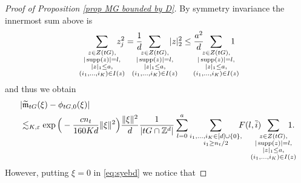 \documentclass[a4paper,oneside, reqno]{amsart}
\numberwithin{equation}{section}
\theoremstyle{definition}%
\theoremstyle{definition}
\theoremstyle{definition}%
\theoremstyle{definition}
\newcommand{\Z}{\mathbb{Z}}
\DeclareMathOperator{\supp}{supp}
\begin{document}
\begin{proof}[Proof of Proposition \ref{prop MG bounded by D}]
By symmetry invariance the innermost sum above is
\[
\sum_{\substack{z \in Z(tG),
\\ |\supp(z)|=l, \\ |z|_1 \le a, \\ (i_1,\ldots,i_K) \in I(z)
}}  \hspace{-0.4cm} z_j^2=  \frac{1}{d} \hspace{-0.5cm}\sum_{\substack{z \in Z(tG),
\\ |\supp(z)|=l, \\ |z|_1 \le a, \\ (i_1,\ldots,i_K) \in I(z)
}}  \hspace{-0.4cm} |z|_2^2 \le  \frac{a^2}{d} \hspace{-0.5cm}\sum_{\substack{z \in Z(tG),
\\ |\supp(z)|=l, \\ |z|_1 \le a, \\ (i_1,\ldots,i_K) \in I(z)
}}  \hspace{-0.4cm} 1
\]
and thus we obtain 
\begin{align*}
&|\widetilde{\mathfrak{m}}_{tG}(\xi)-\phi_{tG,0}(\xi)| \\
&\lesssim_{K,\varepsilon} 
\exp\Big( -\frac{cn_t}{160Kd} \| \xi \|^2 \Big)  \frac{ \| \xi \|^2}{d} \frac{1}{|tG \cap \Z^d|} \sum_{l=0}^a \hspace{-0cm}\sum_{\substack{i_1,...,i_K \in [d] \cup \{0\}, 
\\ 
i_1 \geq n_t/2
}} \hspace{-0.2cm} F(l, \overline{i}) \hspace{-0.5cm}\sum_{\substack{z \in Z(tG),
\\ |\supp(z)|=l, \\ |z|_1 \le a, \\ (i_1,\ldots,i_K) \in I(z)
}}  \hspace{-0.4cm} 1.
\end{align*}
However, putting $\xi=0$ in \eqref{eq:syebd} we notice that 


\end{proof}
\end{document}
